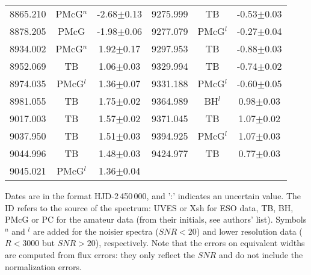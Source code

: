 \documentclass[a4paper,fleqn,usenatbib]{mnras}
\begin{document}
\begin{table}
\begin{tabular}{lcc|lcc}
8865.210 &PMcG$^n$&   -2.68$\pm$0.13 & 9275.999 &TB      &   -0.53$\pm$0.03  \\
8878.205 &PMcG    &   -1.98$\pm$0.06 & 9277.079 &PMcG$^l$&   -0.27$\pm$0.04  \\
8934.002 &PMcG$^n$&    1.92$\pm$0.17 & 9297.953 &TB      &   -0.88$\pm$0.03  \\
8952.069 &TB      &    1.06$\pm$0.03 & 9329.994 &TB      &   -0.74$\pm$0.02  \\
8974.035 &PMcG$^l$&    1.36$\pm$0.07 & 9331.188 &PMcG$^l$&   -0.60$\pm$0.05  \\
8981.055 &TB      &    1.75$\pm$0.02 & 9364.989 &BH$^l$  &    0.98$\pm$0.03  \\
9017.003 &TB      &    1.57$\pm$0.02 & 9371.045 &TB      &    1.07$\pm$0.02  \\
9037.950 &TB      &    1.51$\pm$0.03 & 9394.925 &PMcG$^l$&    1.07$\pm$0.03  \\
9044.996 &TB      &    1.48$\pm$0.03 & 9424.977 &TB      &    0.77$\pm$0.03  \\
9045.021 &PMcG$^l$&    1.36$\pm$0.04 \\
\hline
  \end{tabular}
  
{\scriptsize Dates are in the format HJD-2\,450\,000, and ':' indicates an uncertain value. The ID refers to the source of the spectrum: UVES or Xsh for ESO data, TB, BH, PMcG or PC for the amateur data (from their initials, see authors' list). Symbols $^n$ and $^l$ are added for the noisier spectra ($SNR<20$) and lower resolution data ($R<3000$ but $SNR>20$), respectively. Note that the errors on equivalent widths are computed from flux errors: they only reflect the $SNR$ and do not include the normalization errors. }
\end{table}
\end{document}
